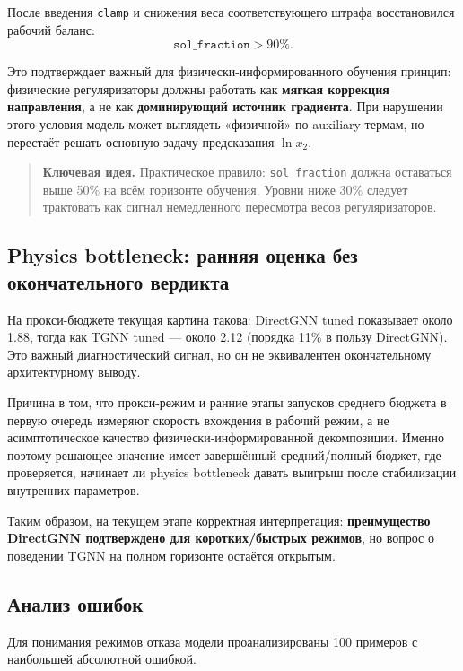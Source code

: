 \documentclass[11pt]{article}
\newcommand{\keyidea}[1]{\begin{quote}\textbf{Ключевая идея.} #1\end{quote}}
\begin{document}
После введения \texttt{clamp} и снижения веса соответствующего штрафа восстановился рабочий баланс:
\begin{equation*}
\texttt{sol\_fraction} > 90\%.
\end{equation*}

Это подтверждает важный для физически-информированного обучения принцип: физические регуляризаторы должны работать как \textbf{мягкая коррекция направления}, а не как \textbf{доминирующий источник градиента}. При нарушении этого условия модель может выглядеть «физичной» по auxiliary-термам, но перестаёт решать основную задачу предсказания $\ln x_2$.

\keyidea{Практическое правило: \texttt{sol\_fraction} должна оставаться выше 50\% на всём горизонте обучения. Уровни ниже 30\% следует трактовать как сигнал немедленного пересмотра весов регуляризаторов.}

\subsection{Physics bottleneck: ранняя оценка без окончательного вердикта}

На прокси-бюджете текущая картина такова: DirectGNN tuned показывает около 1.88, тогда как TGNN tuned --- около 2.12 (порядка 11\% в пользу DirectGNN). Это важный диагностический сигнал, но он не эквивалентен окончательному архитектурному выводу.

Причина в том, что прокси-режим и ранние этапы запусков среднего бюджета в первую очередь измеряют скорость вхождения в рабочий режим, а не асимптотическое качество физически-информированной декомпозиции. Именно поэтому решающее значение имеет завершённый средний/полный бюджет, где проверяется, начинает ли physics bottleneck давать выигрыш после стабилизации внутренних параметров.

Таким образом, на текущем этапе корректная интерпретация: \textbf{преимущество DirectGNN подтверждено для коротких/быстрых режимов}, но вопрос о поведении TGNN на полном горизонте остаётся открытым.

\subsection{Анализ ошибок}

Для понимания режимов отказа модели проанализированы 100 примеров с наибольшей абсолютной ошибкой.
\end{document}
